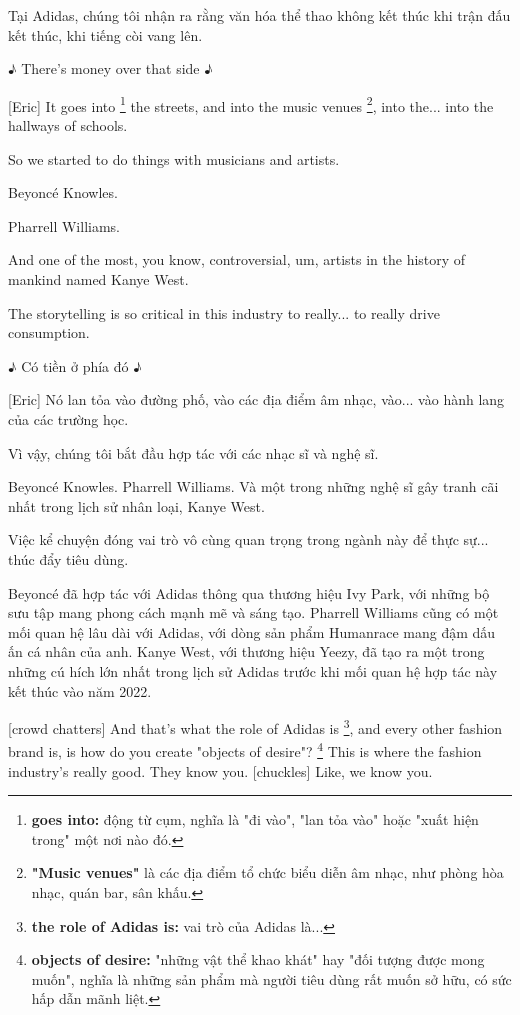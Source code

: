 \documentclass[a4paper]{article}
\begin{document}
	\begin{vietnamese-v2}
		[Eric] Tại Adidas, chúng tôi nhận ra rằng văn hóa thể thao không kết thúc khi trận đấu kết thúc, khi tiếng còi vang lên.
	\end{vietnamese-v2}
	
	\pagebreak
	
	♪ There's money over that side ♪
	
	[Eric] It goes into \footnote{
		\textbf{goes into:} động từ cụm, nghĩa là "đi vào", "lan tỏa vào" hoặc "xuất hiện trong" một nơi nào đó.
	
	} the streets, and into the music venues \footnote{
		\textbf{"Music venues"} là các địa điểm tổ chức biểu diễn âm nhạc, như phòng hòa nhạc, quán bar, sân khấu.
	
	}, into the... into the hallways of schools.
	
	So we started to do things with musicians and artists.
	
	Beyoncé Knowles.
	
	Pharrell Williams.
	
	And one of the most, you know, controversial, um, artists in the history of mankind named Kanye West.

	The storytelling is so critical in this industry to really... to really drive consumption.
	
	\begin{vietnamese-v2}
		♪ Có tiền ở phía đó ♪
		
		[Eric] Nó lan tỏa vào đường phố, vào các địa điểm âm nhạc, vào... vào hành lang của các trường học.
		
		Vì vậy, chúng tôi bắt đầu hợp tác với các nhạc sĩ và nghệ sĩ.
		
		Beyoncé Knowles. Pharrell Williams. Và một trong những nghệ sĩ gây tranh cãi nhất trong lịch sử nhân loại, Kanye West.
		
		Việc kể chuyện đóng vai trò vô cùng quan trọng trong ngành này để thực sự... thúc đẩy tiêu dùng.
		
		Beyoncé đã hợp tác với Adidas thông qua thương hiệu Ivy Park, với những bộ sưu tập mang phong cách mạnh mẽ và sáng tạo. Pharrell Williams cũng có một mối quan hệ lâu dài với Adidas, với dòng sản phẩm Humanrace mang đậm dấu ấn cá nhân của anh. Kanye West, với thương hiệu Yeezy, đã tạo ra một trong những cú hích lớn nhất trong lịch sử Adidas trước khi mối quan hệ hợp tác này kết thúc vào năm 2022.
	\end{vietnamese-v2}
	
	[crowd chatters]
	And that's what the role of Adidas is \footnote{
		\textbf{the role of Adidas is:} vai trò của Adidas là...
	
	}, and every other fashion brand is, is how do you create "objects of desire"? \footnote{
		\textbf{objects of desire:} "những vật thể khao khát" hay "đối tượng được mong muốn", nghĩa là những sản phẩm mà người tiêu dùng rất muốn sở hữu, có sức hấp dẫn mãnh liệt.
	
	}
	This is where the fashion industry's really good. They know you.
	[chuckles] Like, we know you.
	
\end{document}
